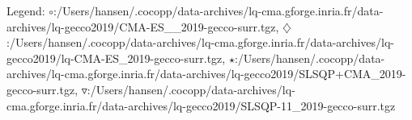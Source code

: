 Legend: {\color{NavyBlue}$\circ$}:/Users/hansen/.cocopp/data-archives/lq-cma.gforge.inria.fr/data-archives/lq-gecco2019/CMA-ES\_\_2019-gecco-surr.tgz, {\color{Magenta}$\diamondsuit$}:/Users/hansen/.cocopp/data-archives/lq-cma.gforge.inria.fr/data-archives/lq-gecco2019/lq-CMA-ES\_2019-gecco-surr.tgz, {\color{Orange}$\star$}:/Users/hansen/.cocopp/data-archives/lq-cma.gforge.inria.fr/data-archives/lq-gecco2019/SLSQP+CMA\_2019-gecco-surr.tgz, {\color{CornflowerBlue}$\triangledown$}:/Users/hansen/.cocopp/data-archives/lq-cma.gforge.inria.fr/data-archives/lq-gecco2019/SLSQP-11\_2019-gecco-surr.tgz